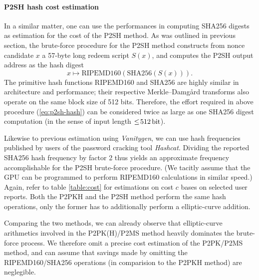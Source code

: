 \documentclass[10pt,a4paper,twocolumn]{article}
\begin{document}
\paragraph{P2SH hash cost estimation}
In a similar matter, one can use the performances in computing {SHA256} digests as estimation for the cost of the {P2SH} method.
%
%
As was outlined in previous section, the brute-force procedure for the {P2SH} method constructs from nonce candidate $x$ a 57-byte long redeem script $S(x)$, and computes the {P2SH} output address as the hash digest 
\begin{equation}
    x \mapsto \text{{RIPEMD160}}(\text{{SHA256}}(S(x))).\label{eq:p2sh-hash}
\end{equation}
The primitive hash functions {RIPEMD160} and {SHA256} are highly similar in architecture and performance; their respective Merkle–Damgård transforms also operate on the same block size of 512 bits.
Therefore, the effort required in above procedure (\ref{eq:p2sh-hash}) can be considered twice as large as one {SHA256} digest computation (in the sense of input length $\leq\!\SI{512}{\bit}$). 

Likewise to previous estimation using \emph{Vanitygen}, we can use hash frequencies published by users of the password cracking tool \emph{Hashcat}.
Dividing the reported SHA256 hash frequency by factor 2 thus yields an approximate frequency accomplishable for the P2SH brute-force procedure.
(We tacitly assume that the GPU can be programmed to perform RIPEMD160 calculations in similar speed.)
Again, refer to table \ref{table:cost} for estimations on cost $c$ bases on selected user reports.
Both the P2PKH and the P2SH method perform the same hash operations, only the former has to additionally perform a elliptic-curve addition.

Comparing the two methods, we can already observe that elliptic-curve arithmetics involved in the P2PK(H)/P2MS method heavily dominates the brute-force process.
We therefore omit a precise cost estimation of the P2PK/P2MS method, and can assume that savings made by omitting the RIPEMD160/SHA256 operations (in comparision to the P2PKH method) are neglegible.
\end{document}
